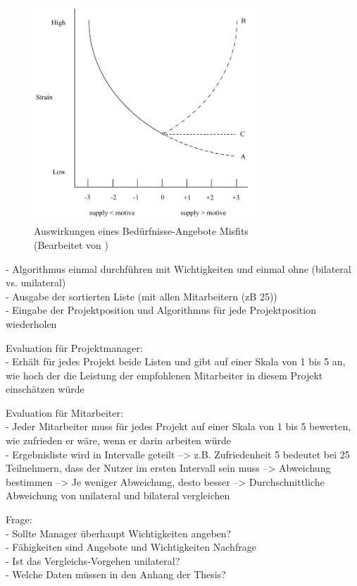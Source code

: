 \begin{figure}[h]
	\centering
	\includegraphics[width=0.75\textwidth]{gfx/ueberschuss_supply_motive.png}
	\caption{Auswirkungen eines Bedürfnisse-Angebote Misfits \cite[S. 23]{edwards:2008}\\(Bearbeitet von \myName)}
	\label{fig:methodik:abb2}
\end{figure}

- Algorithmus einmal durchführen mit Wichtigkeiten und einmal ohne (bilateral vs. unilateral)\\
- Ausgabe der sortierten Liste (mit allen Mitarbeitern (zB 25))\\
- Eingabe der Projektposition und Algorithmus für jede Projektposition wiederholen

Evaluation für Projektmanager:\\
- Erhält für jedes Projekt beide Listen und gibt auf einer Skala von 1 bis 5 an, wie hoch der die Leistung der empfohlenen Mitarbeiter in diesem Projekt einschätzen würde

Evaluation für Mitarbeiter:\\
- Jeder Mitarbeiter muss für jedes Projekt auf einer Skala von 1 bis 5 bewerten, wie zufrieden er wäre, wenn er darin arbeiten würde\\
- Ergebnisliste wird in Intervalle geteilt --> z.B. Zufriedenheit 5 bedeutet bei 25 Teilnehmern, dass der Nutzer im ersten Intervall sein muss --> Abweichung bestimmen --> Je weniger Abweichung, desto besser --> Durchschnittliche Abweichung von unilateral und bilateral vergleichen

Frage:\\
- Sollte Manager überhaupt Wichtigkeiten angeben?\\
	- Fähigkeiten sind Angebote und Wichtigkeiten Nachfrage\\
- Ist das Vergleichs-Vorgehen unilateral?\\
- Welche Daten müssen in den Anhang der Thesis?
